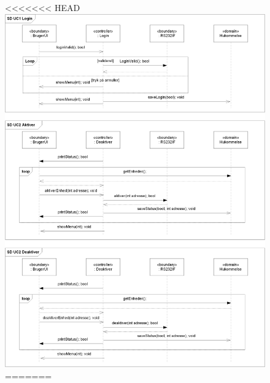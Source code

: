 \begin{figure}[!htb]
<<<<<<< HEAD
     {\includegraphics[width=\textwidth]{billeder/uml/PC_SD1}}
=======

\end{figure}
